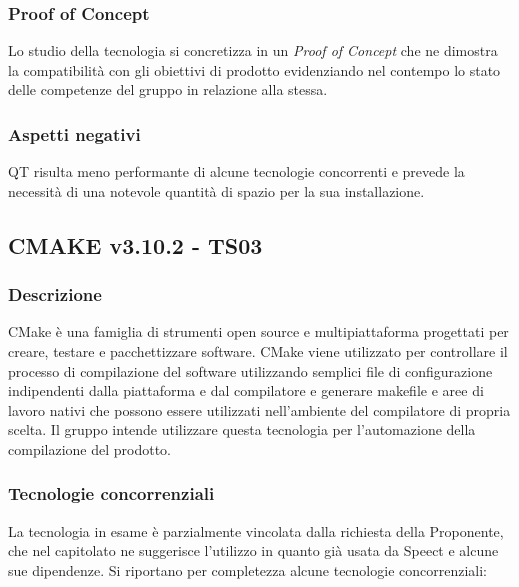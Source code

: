 \documentclass[./../Technology Baseline.tex]{subfiles}
\begin{document}
\subsubsection{Proof of Concept}
Lo studio della tecnologia si concretizza in un \textit{Proof of Concept} che ne dimostra la compatibilità con gli obiettivi di prodotto evidenziando nel contempo lo stato delle competenze del gruppo in relazione alla stessa.

\subsubsection{Aspetti negativi}
QT risulta meno performante di alcune tecnologie concorrenti e prevede la necessità di una notevole quantità di spazio per la sua installazione.

\subsection{CMAKE v3.10.2 - TS03}

\subsubsection{Descrizione}
CMake è una famiglia di strumenti open source e multipiattaforma progettati per creare, testare e pacchettizzare software. CMake viene utilizzato per controllare il processo di compilazione del software utilizzando semplici file di configurazione indipendenti dalla piattaforma e dal compilatore e generare makefile e aree di lavoro nativi che possono essere utilizzati nell'ambiente del compilatore di propria scelta. Il gruppo intende utilizzare questa tecnologia per l’automazione della compilazione del prodotto.

\subsubsection{Tecnologie concorrenziali}
La tecnologia in esame è parzialmente vincolata dalla richiesta della Proponente, che nel capitolato ne suggerisce l'utilizzo in quanto già
usata da Speect e alcune sue dipendenze. Si riportano per completezza alcune tecnologie concorrenziali:
\end{document}
